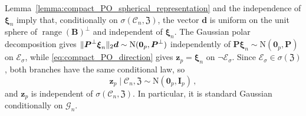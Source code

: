 \documentclass{article}
\makeatletter
\theoremstyle{definition}
\newcommand{\vnorm}[1]{%
	\ensuremath{%
		\if@display
		\left\| #1 \right\|
		\else
		\| #1 \|
		\fi
	}%
}
\newcommand*{\bb}{\boldsymbol}
\newcommand{\range}{\operatorname{range}}
\makeatother
\begin{document}
\begin{bibunit}
Lemma~\ref{lemma:compact_PO_spherical_representation} and the independence
of $\bb\xi_n$ imply that, conditionally on
$\sigma(\mathcal C_n,\bb{\mathfrak Z})$, the vector $\bb d$ is uniform on
the unit sphere of $\range(\bb B)^\perp$ and independent of $\bb\xi_n$.
The Gaussian polar decomposition
\citep[Exercise~3.3.7]{vershynin:2018} gives
$\vnorm{\bb P^\perp\bb\xi_n}_2\bb d
\sim\mathrm N(\bb0_p,\bb P^\perp)$ independently of
$\bb P\bb\xi_n\sim\mathrm N(\bb0_p,\bb P)$ on $\mathcal E_\sigma$, while
\eqref{eq:compact_PO_direction} gives
$\bb z_p=\bb\xi_n$ on $\lnot\mathcal E_\sigma$.
Since $\mathcal E_\sigma\in\sigma(\bb{\mathfrak Z})$, both branches have
the same conditional law, so
\begin{equation}
\label{eq:gaussian-surrogate-law}
    \bb z_p
    \mid
    \mathcal C_n,
    \bb{\mathfrak Z}
    \sim
    \mathrm N(\bb0_p,\bb I_p)\,,
\end{equation}
and $\bb z_p$ is independent of
$\sigma(\mathcal C_n,\bb{\mathfrak Z})$. In particular, it is standard
Gaussian conditionally on $\mathcal G_n$.


\end{bibunit}
\end{document}
